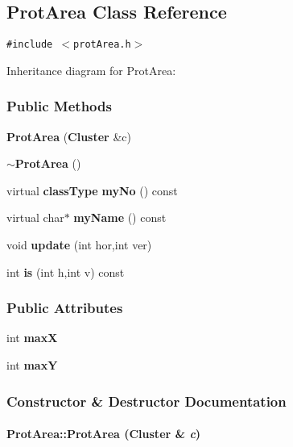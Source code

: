 \subsection{Prot\-Area  Class Reference}
\label{ProtArea}
{\tt \#include $<$prot\-Area.h$>$}

Inheritance diagram for Prot\-Area:\begin{figure}[H]
\begin{center}
\leavevmode
\setlength{\epsfysize}{4cm}
\end{center}
\end{figure}
\subsubsection*{Public Methods}
\begin{CompactItemize}
\item 
{\bf Prot\-Area} ({\bf Cluster} \&c)
\item 
{\bf $\sim$Prot\-Area} ()
\item 
virtual {\bf class\-Type} {\bf my\-No} () const
\item 
virtual char$\ast$ {\bf my\-Name} () const
\item 
void {\bf update} (int hor,int ver)
\item 
int {\bf is} (int h,int v) const
\end{CompactItemize}
\subsubsection*{Public Attributes}
\begin{CompactItemize}
\item 
int {\bf max\-X}
\item 
int {\bf max\-Y}
\end{CompactItemize}


\subsubsection{Constructor \& Destructor Documentation}
\label{ProtArea_a0}
\paragraph{\setlength{\rightskip}{0pt plus 5cm}Prot\-Area::Prot\-Area ({\bf Cluster} \& {\em c})}\hfill




